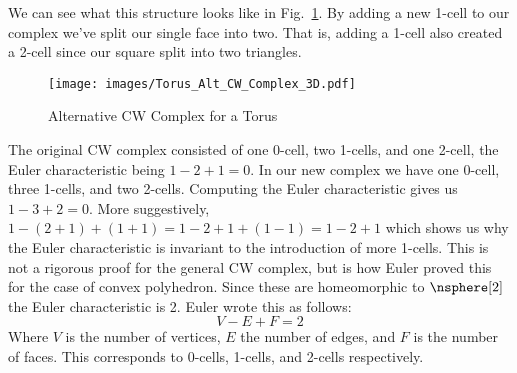 \documentclass{book}                                                           %
\begin{document}
            \hfill
            \par\vspace{2.5ex}
            We can see what this structure looks like in
            Fig.~\ref{fig:Alt_CW_Complex_for_Torus_3D}. By adding a new 1-cell
            to our complex we've split our single face into two. That is, adding
            a 1-cell also created a 2-cell since our square split into two
            triangles.
            \begin{figure}[H]
                \centering
                \captionsetup{type=figure}
                \if{}
                    \texttt{[image: images/Torus\_Alt\_CW\_Complex\_3D.pdf]}
                \fi
                \caption{Alternative CW Complex for a Torus}
                \label{fig:Alt_CW_Complex_for_Torus_3D}
            \end{figure}
            The original CW complex consisted of one 0-cell, two 1-cells, and
            one 2-cell, the Euler characteristic being $1-2+1=0$. In our new
            complex we have one 0-cell, three 1-cells, and two 2-cells.
            Computing the Euler characteristic gives us $1-3+2=0$. More
            suggestively, $1-(2+1)+(1+1)=1-2+1+(1-1)=1-2+1$ which shows us why
            the Euler characteristic is invariant to the introduction of more
            1-cells. This is not a rigorous proof for the general CW complex,
            but is how Euler proved this for the case of convex polyhedron.
            Since these are homeomorphic to $\nsphere[2]$ the Euler
            characteristic is 2. Euler wrote this as follows:
            \begin{equation}
                V-E+F=2
            \end{equation}
            Where $V$ is the number of vertices, $E$ the number of edges, and
            $F$ is the number of faces. This corresponds to 0-cells, 1-cells,
            and 2-cells respectively.
\end{document}
